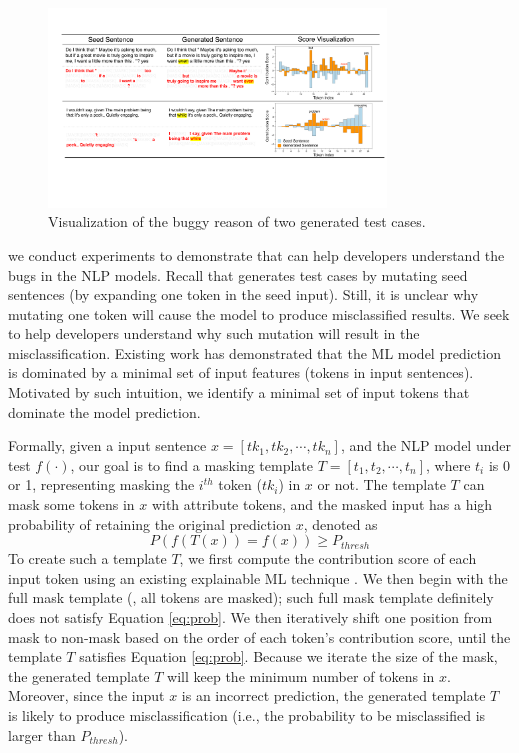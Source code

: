 \begin{figure}
    \centering
    \includegraphics[width=0.8\textwidth]{figs/explain.pdf}
    \vspace{-4mm}
    \caption{Visualization of the buggy reason of two \tool generated test cases.}
    \label{fig:explain}
\end{figure}


we conduct experiments to demonstrate that \tool can help developers understand the bugs in the NLP models.
Recall that \tool generates test cases by mutating seed sentences (\eg by expanding one token in the seed input). Still, it is unclear why mutating one token will cause the model to produce misclassified results.
We seek to help developers understand why such mutation will result in the misclassification. 
Existing work \cite{simin2020denas, lemna, lime} has demonstrated that the ML model prediction is dominated by a minimal set of input features (\ie tokens in input sentences). Motivated by such intuition, we identify a minimal set of input tokens that dominate the model prediction.

Formally, given a input sentence $x = [tk_1, tk_2, \cdots, tk_n]$, and the NLP model under test $f(\cdot)$, our goal is to find a masking template $T = [t_1, t_2, \cdots, t_n]$, where $t_i$ is 0 or 1, representing masking the $i^{th}$ token (\ie $tk_i$) in $x$ or not.
The template $T$ can mask some tokens in $x$ with attribute tokens, and the masked input has a high probability of retaining the original prediction $x$, denoted as
\begin{equation}
    P(f(T(x)) = f(x)) \ge P_{thresh}
    \label{eq:prob}
\end{equation}
To create such a template $T$, we first compute the contribution score of each input token using an existing explainable ML technique \cite{lemna}. We then begin with the full mask template (\ie, all tokens are masked); such full mask template definitely does not satisfy Equation \ref{eq:prob}.
We then iteratively shift one position from mask to non-mask based on the order of each token's contribution score, until the template $T$ satisfies Equation \ref{eq:prob}.
Because we iterate the size of the mask, the generated template $T$ will keep the minimum number of tokens in $x$. Moreover, since the input $x$ is an incorrect prediction, the generated template $T$ is likely to produce misclassification (i.e., the probability to be misclassified is larger than $P_{thresh}$).

